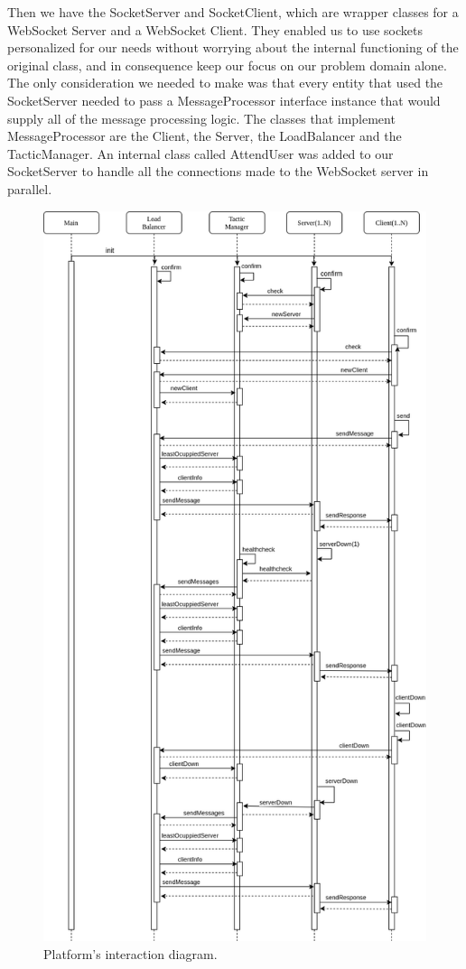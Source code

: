 \documentclass[12pt]{article}
\begin{document}
Then we have the SocketServer and SocketClient, which are wrapper classes for a WebSocket Server and a WebSocket Client.
They enabled us to use sockets personalized for our needs without worrying about the internal functioning of the original class, and in consequence keep our 
focus on our problem domain alone.
The only consideration we needed to make was that every entity that used the SocketServer needed to pass a MessageProcessor interface instance that would supply
all of the message processing logic.
The classes that implement MessageProcessor are the Client, the Server, the LoadBalancer and the TacticManager.
An internal class called AttendUser was added to our SocketServer to handle all the connections made to the WebSocket server in parallel.

\begin{figure}[H]
  \centering
  \begin{minipage}{\textwidth}
    \centering
    \includegraphics[width=.75\linewidth]{img/pa3Interaction.png}
  \end{minipage}%
  \caption{Platform's interaction diagram.}
  \label{fig:pa3Interaction}
\end{figure} 
\end{document}
